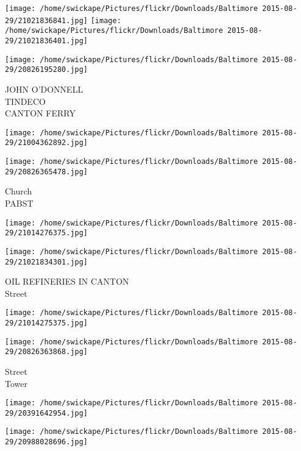 \documentclass[10pt,letterpaper]{article}
\begin{document}
\texttt{[image: /home/swickape/Pictures/flickr/Downloads/Baltimore 2015-08-29/21021836841.jpg]}
\texttt{[image: /home/swickape/Pictures/flickr/Downloads/Baltimore 2015-08-29/21021836401.jpg]}

\vspace{0.25in}
\texttt{[image: /home/swickape/Pictures/flickr/Downloads/Baltimore 2015-08-29/20826195280.jpg]}

JOHN O'DONNELL\\
TINDECO\\
CANTON FERRY\\
\pagebreak

\texttt{[image: /home/swickape/Pictures/flickr/Downloads/Baltimore 2015-08-29/21004362892.jpg]}

\vspace{0.25in}
\texttt{[image: /home/swickape/Pictures/flickr/Downloads/Baltimore 2015-08-29/20826365478.jpg]}

Church\\
PABST\\
\pagebreak

\texttt{[image: /home/swickape/Pictures/flickr/Downloads/Baltimore 2015-08-29/21014276375.jpg]}

\vspace{0.25in}
\texttt{[image: /home/swickape/Pictures/flickr/Downloads/Baltimore 2015-08-29/21021834301.jpg]}

OIL REFINERIES IN CANTON\\
Street\\
\pagebreak

\texttt{[image: /home/swickape/Pictures/flickr/Downloads/Baltimore 2015-08-29/21014275375.jpg]}

\vspace{0.25in}
\texttt{[image: /home/swickape/Pictures/flickr/Downloads/Baltimore 2015-08-29/20826363868.jpg]}

Street\\
Tower\\
\pagebreak

\texttt{[image: /home/swickape/Pictures/flickr/Downloads/Baltimore 2015-08-29/20391642954.jpg]}

\vspace{0.25in}
\texttt{[image: /home/swickape/Pictures/flickr/Downloads/Baltimore 2015-08-29/20988028696.jpg]}
\end{document}
